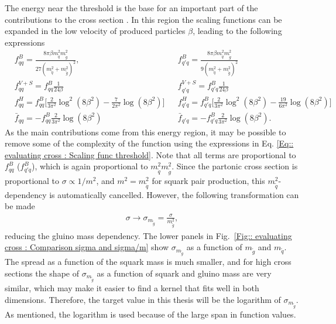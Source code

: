 \documentclass[twoside,english]{uiofysmaster}
\begin{document}
The energy near the threshold is the base for an important part of the contributions to the cross section \cite{beenakker1997squark}. In this region the scaling functions can be expanded in the low velocity of produced particles $\beta$, leading to the following expressions \cite{beenakker1997squark}
\begin{align}
&f_{qq}^B = \frac{8 \pi \beta m_{\tilde{q}}^2 m_{\tilde{g}}^2}{27(m_{\tilde{q}}^2 + m_{\tilde{g}}^2)^2}, &&f_{q'q}^B = \frac{8 \pi \beta m_{\tilde{q}}^2 m_{\tilde{g}}^2}{9(m_{\tilde{q}}^2 + m_{\tilde{g}}^2)^2} \nonumber \\
& f_{qq}^{V+S} = f_{qq}^B \frac{1}{24 \beta} && f_{q'q}^{V+S} = f_{q'q}^B \frac{1}{24 \beta} \nonumber \\
&f_{qq}^H = f_{qq}^B \Big[\frac{2}{3 \pi^2} \log^2(8 \beta^2) - \frac{7}{2 \pi^2} \log (8 \beta^2) \Big] &&f_{q'q}^H = f_{q'q}^B \Big[\frac{2}{3 \pi^2} \log^2(8 \beta^2) - \frac{19}{6 \pi^2} \log (8 \beta^2) \Big] \nonumber \\
& \bar{f}_{qq} = - f_{qq}^B \frac{2}{3 \pi^2} \log (8 \beta^2) &&\bar{f}_{q'q} = - f_{q'q}^B \frac{2}{3 \pi^2} \log (8 \beta^2).\label{Eq:: evaluating cross : Scaling func threshold}
\end{align}
As the main contributions come from this energy region, it may be possible to remove some of the complexity of the function using the expressions in Eq. \ref{Eq:: evaluating cross : Scaling func threshold}. Note that all terms are proportional to $f_{qq}^B$ ($f_{q'q}^B$), which is again proportional to $m_{\tilde{q}}^2 m_{\tilde{g}}^2$. Since the partonic cross section is proportional to $\sigma \propto 1/m^2$, and $m^2 = m_{\tilde{q}}^2$ for squark pair production, this $m_{\tilde{q}}^2$-dependency is automatically cancelled. However, the following transformation can be made
\begin{align}
\sigma \rightarrow \sigma_{m_{\tilde{g}}} = \frac{\sigma}{m_{\tilde{g}}^2},
\end{align}
reducing the gluino mass dependency. The lower panels in Fig.~\ref{Fig:: evaluating cross : Comparison sigma and sigma/m} show $\sigma_{m_{\tilde{g}}}$ as a function of $m_{\tilde{g}}$ and $m_{\tilde{q}}$. The spread as a function of the squark mass is much smaller, and for high cross sections the shape of $\sigma_{m_{\tilde{g}}}$ as a function of squark and gluino mass are very similar, which may make it easier to find a kernel that fits well in both dimensions. Therefore, the target value in this thesis will be the logarithm of $\sigma_{m_{\tilde{g}}}$. As mentioned, the logarithm is used because of the large span in function values. 
\end{document}

